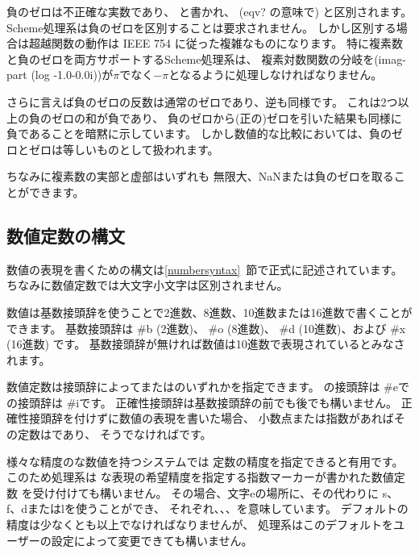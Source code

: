 負のゼロは不正確な実数であり、{} と書かれ、
({\cf eqv?} の意味で) {} と区別されます。
Scheme処理系は負のゼロを区別することは要求されません。
しかし区別する場合は超越関数の動作は IEEE 754 に従った複雑なものになります。
特に複素数と負のゼロを両方サポートするScheme処理系は、
複素対数関数の分岐を{\cf (imag-part (log -1.0-0.0i))}が$\pi$でなく$-\pi$となるように処理しなければなりません。

さらに言えば負のゼロの反数は通常のゼロであり、逆も同様です。
これは2つ以上の負のゼロの和が負であり、
負のゼロから(正の)ゼロを引いた結果も同様に負であることを暗黙に示しています。
しかし数値的な比較においては、負のゼロとゼロは等しいものとして扱われます。

ちなみに複素数の実部と虚部はいずれも
無限大、NaNまたは負のゼロを取ることができます。

\subsection{数値定数の構文}
\label{numbernotations}

数値の表現を書くための構文は\ref{numbersyntax}~節で正式に記述されています。
ちなみに数値定数では大文字小文字は区別されません。

数値は基数接頭辞を使うことで2進数、8進数、10進数または16進数で書くことができます。
基数接頭辞は %
{\cf \#b} (2進数)、
{\cf \#o} (8進数)、
{\cf \#d} (10進数)、および %
{\cf \#x} (16進数) です。
基数接頭辞が無ければ数値は10進数で表現されているとみなされます。

数値定数は接頭辞によってまたはのいずれかを指定できます。
の接頭辞は {\cf \#e}で
の接頭辞は {\cf \#i}です。
正確性接頭辞は基数接頭辞の前でも後でも構いません。
正確性接頭辞を付けずに数値の表現を書いた場合、
小数点または指数があればその定数はであり、
そうでなければです。

様々な精度のな数値を持つシステムでは
定数の精度を指定できると有用です。
このため処理系は
な表現の希望精度を指定する指数マーカーが書かれた数値定数
を受け付けても構いません。
その場合、文字{\cf e}の場所に、その代わりに
{\cf s}、{\cf f}、{\cf d}または{\cf l}を使うことができ、
それぞれ、、、を意味しています。
デフォルトの精度は少なくとも以上でなければなりませんが、
処理系はこのデフォルトをユーザーの設定によって変更できても構いません。


